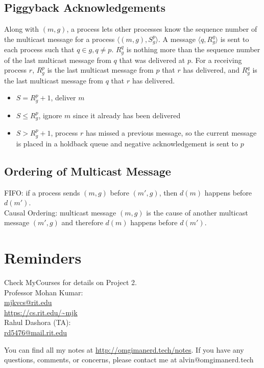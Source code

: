 \documentclass{math}
\begin{document}
\subsection*{Piggyback Acknowledgements}
Along with \( (m,g) \), a process lets other processes know the sequence
number of the multicast message for a process \( \langle(m,g),S_g^p\rangle \).
A message \( \langle q,R_g^q\rangle \) is sent to each process such that
\( q\in g, q\ne p \). \( R_g^q \) is nothing more than the sequence number of
the last multicast message from \( q \) that was delivered at \( p \). For a
receiving process \( r \), \( R_g^p \) is the last multicast message from
\( p \) that \( r \) has delivered, and \( R_g^q \) is the last multicast
message from \( q \) that \( r \) has delivered.
\begin{itemize}
  \item \( S = R_g^p+1 \), deliver \( m \)
  \item \( S \le R_g^p \), ignore \( m \) since it already has been delivered
  \item \( S > R_g^p+1 \), process \( r \) has missed a previous message, so the
  current message is placed in a holdback queue and negative acknowledgement is
  sent to \( p \)
\end{itemize}

\subsection*{Ordering of Multicast Message}
FIFO: if a process sends \( (m,g) \) before \( (m',g) \), then \( d(m) \)
happens before \( d(m') \). \\
Causal Ordering: multicast message \( (m,g) \) is the cause of another
multicast message \( (m',g) \) and therefore \( d(m) \) happens before
\( d(m') \).

\section*{Reminders}
Check MyCourses for details on Project 2. \\
\noindent Professor Mohan Kumar: \\
\url{mjkvcs@rit.edu} \\
\url{https://cs.rit.edu/~mjk} \\

\noindent Rahul Dashora (TA): \\
\url{rd5476@mail.rit.edu} \\

\begin{center}
  You can find all my notes at \url{http://omgimanerd.tech/notes}. If you have
  any questions, comments, or concerns, please contact me at
  alvin@omgimanerd.tech
\end{center}
\end{document}
